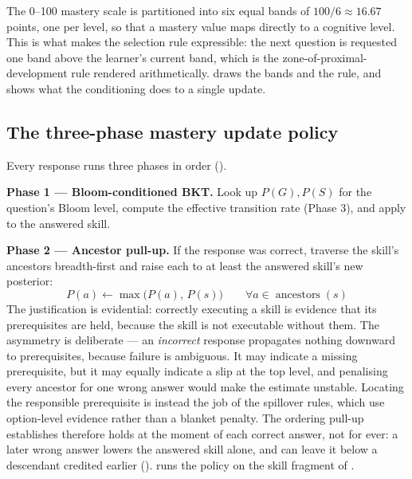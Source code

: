 The 0--100 mastery scale is partitioned into six equal bands of
$100/6 \approx 16.67$ points, one per level, so that a mastery value maps
directly to a cognitive level. This is what makes the selection rule expressible:
the next question is requested one band above the learner's current band, which
is the zone-of-proximal-development rule \cite{vygotsky1978mind} rendered
arithmetically.  draws the bands and the rule, and
 shows what the conditioning does to a single update.




\subsection{The three-phase mastery update policy}
\label{sec:mastery-policy}

Every response runs three phases in order ().



\textbf{Phase 1 --- Bloom-conditioned BKT.} Look up $P(G), P(S)$ for the
question's Bloom level, compute the effective transition rate (Phase 3), and
apply  to the
answered skill.

\textbf{Phase 2 --- Ancestor pull-up.} If the response was correct, traverse the
skill's ancestors breadth-first and raise each to at least the answered skill's
new posterior:
\begin{equation}
  P(a) \leftarrow \max\bigl(P(a),\, P(s)\bigr)
  \qquad \forall a \in \operatorname{ancestors}(s)
  \label{eq:pullup}
\end{equation}
The justification is evidential: correctly executing a skill is evidence that
its prerequisites are held, because the skill is not executable without them.
The asymmetry is deliberate --- an \emph{incorrect} response propagates nothing
downward to prerequisites, because failure is ambiguous. It may indicate a
missing prerequisite, but it may equally indicate a slip at the top level, and
penalising every ancestor for one wrong answer would make the estimate
unstable. Locating the responsible prerequisite is instead the job of the
spillover rules, which use option-level evidence rather than a blanket penalty.
The ordering pull-up establishes therefore holds at the moment of each correct
answer, not for ever: a later wrong answer lowers the answered skill alone, and
can leave it below a descendant credited earlier
().  runs the policy on
the skill fragment of .

